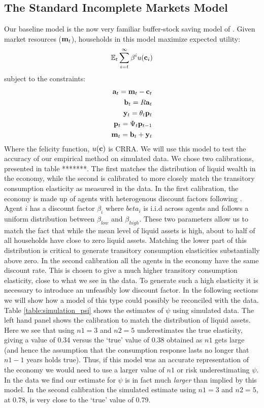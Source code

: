 \documentclass[titlepage]{\econtex}\newcommand{\texname}{IncomeUncertainty}
\begin{document}
\subsection{The Standard Incomplete Markets Model} \label{standard_model}
Our baseline model is the now very familiar buffer-stock saving model of \cite{carroll_buffer_1997}. Given market resources ($\boldmath{\ensuremath{\mathbf{m}}}_t$), households in this model maximize expected utility:
\begin{align*}
	\mathbb{E}_t \sum_{i=t}^{\infty} \beta^i u(\mathbf{c}_i)
\end{align*}
subject to the constraints:
\begin{align*}
	\mathbf{a}_t = \mathbf{m}_t - \mathbf{c}_t \\
	\mathbf{b}_t = R\mathbf{a}_t \\
	\mathbf{y}_t = \theta_t \mathbf{p}_t \\
	\mathbf{p}_t = \Psi_t \mathbf{p}_{t-1} \\
	\mathbf{m}_t = \mathbf{b}_t + \mathbf{y}_t
\end{align*}
Where the felicity function, $u(\mathbf{c})$ is CRRA. We will use this model to test the accuracy of our empirical method on simulated data. We chose two calibrations, presented in table *******. The first matches the distribution of liquid wealth in the economy, while the second is calibrated to more closely match the transitory consumption elasticity as measured in the data. In the first calibration, the economy is made up of agents with heterogenous discount factors following \cite{carroll_distribution_2016}. Agent $i$ has a discount factor $\beta_i$ where $beta_i$ is i.i.d across agents and follows a uniform distribution between $\beta_{low}$ and $\beta_{high}$. These two parameters allow us to match the fact that while the mean level of liquid assets is high, about to half of all households have close to zero liquid assets. Matching the lower part of this distribution is critical to generate transitory consumption elasticities substantially above zero. In the second calibration all the agents in the economy have the same discount rate. This is chosen to give a much higher transitory consumption elasticity, close to what we see in the data. To generate such a high elasticity it is necessary to introduce an unfeasibly low discount factor. In the following sections we will show how a model of this type could possibly be reconciled with the data.
Table \ref{table:simulation_psi} shows the estimates of $\psi$ using simulated data. The left hand panel shows the calibration to match the distribution of liquid assets. Here we see that using $n1=3$ and $n2=5$ underestimates the true elasticity, giving a value of 0.34 versus the `true' value of 0.38 obtained as $n1$ gets large (and hence the assumption that the consumption response lasts no longer that $n1-1$ years holds true). Thus, if this model was an accurate representation of the economy we would need to use a larger value of $n1$ or risk underestimating $\psi$. In the data we find our estimate for $\psi$ is in fact much \textit{larger} than implied by this model. In the second calibration the simulated estimate using $n1=3$ and $n2=5$, at 0.78, is very close to the `true' value of 0.79.
\end{document}
